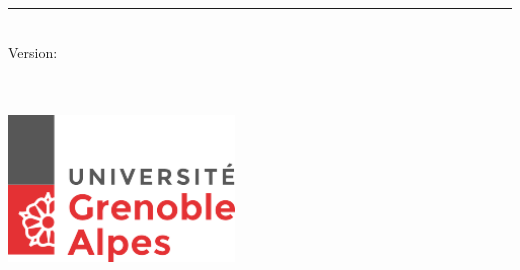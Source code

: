 %
\begin{titlepage}
	\flushright
	\hfill
	\vfill
	{\LARGE\thesisTitle \par}
	\rule[5pt]{\textwidth}{.4pt} \par
	{\Large\thesisName}
	\vfill
	\textit{\large\thesisDate} \\
	Version: \thesisVersion
\end{titlepage}


\begin{titlepage}
	\tgherosfont
	\centering

	{\Huge \thesisUniversity} \\[2mm]
    {\Large \thesisUniversityDepartment} \\[4mm]
	\includegraphics[width=6cm]{gfx/logo-uga.png} \\[2mm]
	
	\textsf{\large \thesisUniversityGroup} \\
    \textsf{\large \thesisUniversityInstitute} \\

	\vfill
	{\Large \thesisSubject} \\[5mm]
	{\LARGE \color{ctcolortitle}\textbf{\thesisTitle} \\[10mm]}
	{\Large \thesisName} \\


\end{titlepage}
